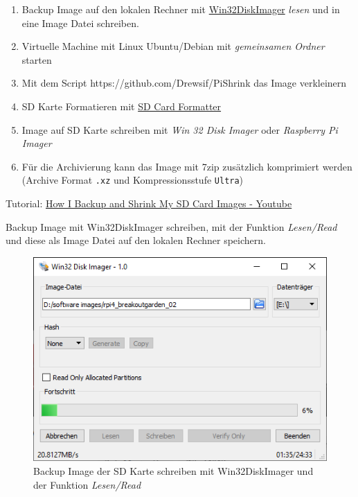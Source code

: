 \documentclass[
  11pt,
  a4paperpaper,
  oneside, openany  ,captions=tableheading
]{scrbook}
\providecommand{\tightlist}{%
  \setlength{\itemsep}{0pt}\setlength{\parskip}{0pt}}
\theoremstyle{definition}
\theoremstyle{remark}
\begin{document}
\begin{enumerate}
\def\labelenumi{\arabic{enumi}.}
\tightlist
\item
  Backup Image auf den lokalen Rechner mit
  \href{https://sourceforge.net/projects/win32diskimager/}{Win32DiskImager}
  \emph{lesen} und in eine Image Datei schreiben.
\item
  Virtuelle Machine mit Linux Ubuntu/Debian mit \emph{gemeinsamen
  Ordner} starten
\item
  Mit dem Script https://github.com/Drewsif/PiShrink das Image
  verkleinern
\item
  SD Karte Formatieren mit
  \href{https://www.sdcard.org/downloads/formatter}{SD Card Formatter}
\item
  Image auf SD Karte schreiben mit \emph{Win 32 Disk Imager} oder
  \emph{Raspberry Pi Imager}
\item
  Für die Archivierung kann das Image mit 7zip zusätzlich komprimiert
  werden (Archive Format \texttt{.xz} und Kompressionsstufe
  \texttt{Ultra})
\end{enumerate}

Tutorial: \href{https://www.youtube.com/watch?v=5pdgO3Ncl6k}{How I
Backup and Shrink My SD Card Images - Youtube}

Backup Image mit Win32DiskImager schreiben, mit der Funktion
\emph{Lesen/Read} und diese als Image Datei auf den lokalen Rechner
speichern.

\begin{figure}[H]

{\centering \includegraphics{images/raspberrypi_image_verkleinern_01.png}

}

\caption{Backup Image der SD Karte schreiben mit Win32DiskImager und der
Funktion \emph{Lesen/Read}}

\end{figure}%
\end{document}
